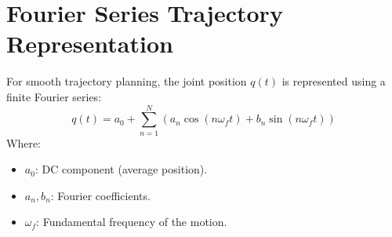 \documentclass{article}
\begin{document}
\section{Fourier Series Trajectory Representation}
For smooth trajectory planning, the joint position $q(t)$ is represented using a finite Fourier series:
\begin{equation}
q(t) = a_0 + \sum_{n=1}^{N} \left( a_n \cos(n\omega_f t) + b_n \sin(n\omega_f t) \right)
\end{equation}
Where:
\begin{itemize}
    \item $a_0$: DC component (average position).
    \item $a_n, b_n$: Fourier coefficients.
    \item $\omega_f$: Fundamental frequency of the motion.
\end{itemize}
\end{document}
